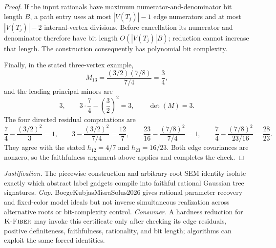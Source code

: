 \documentclass{article}
\begin{document}
\begin{proof}
If the input rationals have maximum numerator-and-denominator bit length \(B\), a path entry uses at most \(|V(T_j)|-1\) edge numerators and at most \(|V(T_j)|-2\) internal-vertex divisions.  Before cancellation its numerator and denominator therefore have bit length \(O(|V(T_j)|B)\); reduction cannot increase that length.  The construction consequently has polynomial bit complexity.

Finally, in the stated three-vertex example,
\[
 M_{13}=\frac{(3/2)(7/8)}{7/4}=\frac34,
\]
and the leading principal minors are
\[
 3,\qquad 3\cdot\frac74-\left(\frac32\right)^2=3,
 \qquad \det(M)=3.
\]
The four directed residual computations are
\[
 \frac74-\frac{(3/2)^2}{3}=1,
 \qquad
 3-\frac{(3/2)^2}{7/4}=\frac{12}{7},
 \qquad
 \frac{23}{16}-\frac{(7/8)^2}{7/4}=1,
 \qquad
 \frac74-\frac{(7/8)^2}{23/16}=\frac{28}{23}.
\]
They agree with the stated \(h_{12}=4/7\) and \(h_{23}=16/23\).  Both edge covariances are nonzero, so the faithfulness argument above applies and completes the check.
\end{proof}
\par\smallskip\noindent \textit{Justification.} The piecewise construction and arbitrary-root SEM identity isolate exactly which abstract label gadgets compile into faithful rational Gaussian tree signatures. \textit{Gap.} BoegeKubjasMisraSolus2026 gives rational parameter recovery and fixed-color model ideals but not inverse simultaneous realization across alternative roots or bit-complexity control. \textit{Consumer.} A hardness reduction for \(\textsc{K-Fiber}\) may invoke this certificate only after checking its edge residuals, positive definiteness, faithfulness, rationality, and bit length; algorithms can exploit the same forced identities.
\end{document}
